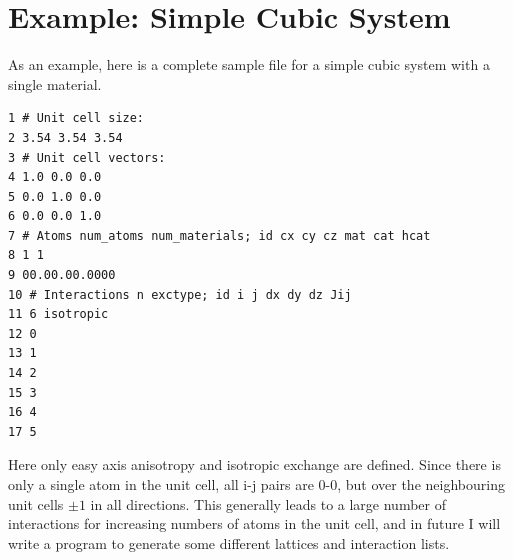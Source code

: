 \section*{Example: Simple Cubic System}
As an example, here is a complete sample file for a simple cubic system with a single material.
\begin{verbatim}
1 # Unit cell size:
2 3.54 3.54 3.54
3 # Unit cell vectors:
4 1.0 0.0 0.0
5 0.0 1.0 0.0
6 0.0 0.0 1.0
7 # Atoms num_atoms num_materials; id cx cy cz mat cat hcat
8 1 1
9 00.00.00.0000
10 # Interactions n exctype; id i j dx dy dz Jij
11 6 isotropic
12 0
13 1
14 2
15 3
16 4
17 5
\end{verbatim}

Here only easy axis anisotropy and isotropic exchange are defined. Since there is only a single atom in the unit cell, all i-j pairs are 0-0, but over the neighbouring unit cells $\pm 1$ in all directions. This generally
leads to a large number of interactions for increasing numbers of atoms in the unit cell, and in future I will write a program to generate some different lattices and interaction lists.
 








%
